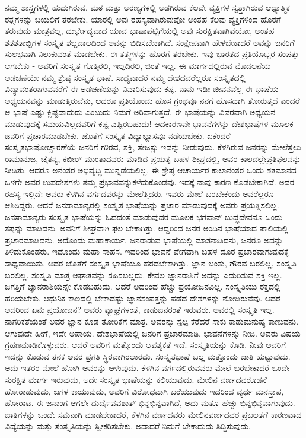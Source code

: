 ನಮ್ಮ ಶಾಸ್ತ್ರಗಳಲ್ಲಿ ಹುದುಗಿರುವ, ಮಠ ಮತ್ತು ಅರಣ್ಯಗಳಲ್ಲಿ ಅಡಗಿರುವ ಕೆಲವೇ ವ್ಯಕ್ತಿಗಳ ಸ್ವತ್ತಾಗಿರುವ ಆಧ್ಯಾತ್ಮಿಕ ರತ್ನಗಳನ್ನು ಬಯಲಿಗೆ ತರಬೇಕು. ಯಾರಲ್ಲಿ ಅವು ರಹಸ್ಯವಾಗಿರುವುವೋ ಅಂತಹ ಕೆಲವು ವ್ಯಕ್ತಿಗಳಿಂದ ಹೊರಗೆ ತರುವುದು ಮಾತ್ರವಲ್ಲ, ದುರ್ಭೇದ್ಯವಾದ ಯಾವ ಭಾಷಾಪೆಟ್ಟಿಗೆಯಲ್ಲಿ ಅವು ಸುರಕ್ಷಿತವಾಗಿವೆಯೋ, ಅಂತಹ ಶತಶತಾಬ್ದಿಗಳ ಸಂಸ್ಕೃತ ಶಬ್ದಜಾಲದಿಂದ ಅವನ್ನು ಬಿಡಿಸಬೇಕಾಗಿದೆ. ಸಂಕ್ಷೇಪವಾಗಿ ಹೇಳಬೇಕಾದರೆ ಅವನ್ನು ಜನರಿಗೆ ಸುಲಭವಾಗಿ ನಿಲುಕುವಂತೆ ಮಾಡಬೇಕು. ಈ ತತ್ತ್ವಗಳನ್ನು ಹೊರಗೆ ತರಬೇಕು. ಇವು ಭಾರತದ ಪ್ರತಿಯೊಬ್ಬರ ಸಂಪತ್ತು ಆಗಬೇಕು - ಅವರಿಗೆ ಸಂಸ್ಕೃತ ಗೊತ್ತಿರಲಿ, ಇಲ್ಲದಿರಲಿ, ಚಿಂತೆ ಇಲ್ಲ. ಈ ಮಾರ್ಗದಲ್ಲಿರುವ ಮೊದಲನೆಯ ಅಡಚಣೆಯೇ ನಮ್ಮ ಶ್ರೇಷ್ಠ ಸಂಸ್ಕೃತ ಭಾಷೆ. ಸಾಧ್ಯವಾದರೆ ನಮ್ಮ ದೇಶದವರೆಲ್ಲರೂ ಸಂಸ್ಕೃತದಲ್ಲಿ ವಿದ್ಯಾವಂತರಾಗುವವರೆಗೆ ಈ ಅಡಚಣೆಯನ್ನು ನಿವಾರಿಸುವುದು ಕಷ್ಟ. ನಾನು ಇಡೀ ಜೀವನವೆಲ್ಲ ಈ ಭಾಷೆಯ ಅಧ್ಯಯನವನ್ನು ಮಾಡುತ್ತಿರುವೆನು, ಆದರೂ ಪ್ರತಿಯೊಂದು ಹೊಸ ಗ್ರಂಥವೂ ನನಗೆ ಹೊಸದಾಗಿ ತೋರುತ್ತದೆ ಎಂದರೆ ಆ ಭಾಷೆ ಎಷ್ಟು ಕ್ಲಿಷ್ಟವಾದುದು ಎಂಬುದು ನಿಮಗೆ ಅರಿವಾಗುತ್ತದೆ. ಈ ಭಾಷೆಯನ್ನು ವಿವರವಾಗಿ ಅಧ್ಯಯನ ಮಾಡುವುದಕ್ಕೆ ಸಮಯವಿಲ್ಲದವರಿಗೆ ಕಷ್ಟ ಎಷ್ಟಿರಬಹುದು! ಆದಕಾರಣವೇ ಭಾವನೆಗಳನ್ನು ದೇಶಭಾಷೆಗಳ ಮೂಲಕ ಜನರಿಗೆ ಪ್ರಚಾರಮಾಡಬೇಕು. ಜೊತೆಗೆ ಸಂಸ್ಕೃತ ವಿದ್ಯಾಭ್ಯಾಸವೂ ನಡೆಯಬೇಕು. ಏಕೆಂದರೆ ಸಂಸ್ಕೃತಭಾಷೋಚ್ಚಾರಣೆಯೆ ಜನರಿಗೆ ಗೌರವ, ಶಕ್ತಿ, ತೇಜಸ್ಸು ಇವನ್ನು ನೀಡುವುದು. ಕೆಳಗಿರುವ ಜನರನ್ನು ಮೇಲೆತ್ತಲು ರಾಮಾನುಜ, ಚೈತನ್ಯ, ಕಬೀರ್​ ಮುಂತಾದವರು ಮಾಡಿದ ಪ್ರಯತ್ನ ಬಹಳ ಶೀಘ್ರದಲ್ಲಿ, ಅವರ ಕಾಲದಲ್ಲೇ\break ಪ್ರತಿಫಲವನ್ನು ನೀಡಿತು. ಆದರೂ ಅನಂತರ ಅಭಿವೃದ್ಧಿ ಮುನ್ನಡೆಯಲಿಲ್ಲ. ಈ ಶ್ರೇಷ್ಠ ಆಚಾರ್ಯರ ಕಾಲಾನಂತರ ಒಂದು ಶತಮಾನದ ಒಳಗೇ ಅವರ ಉಪದೇಶಗಳು ತಮ್ಮ ಪ್ರಭಾವವನ್ನುಕಳೆದುಕೊಂಡವು. ಇದಕ್ಕೆ ನಾವು ಕಾರಣ ಕೊಡಬೇಕಾಗಿದೆ. ಅದರ ರಹಸ್ಯ ಇಲ್ಲಿದೆ: ಅವರು ಕೆಳಗಿನ ವರ್ಗದವರನ್ನು ಮೇಲೆತ್ತಿದರು. ಇವರು ಮೇಲೆ ಬರಬೇಕೆಂದು ಅವರೆಲ್ಲರೂ ಆಶಿಸಿದ್ದರು. ಆದರೆ ಜನಸಾಮಾನ್ಯರಲ್ಲಿ ಸಂಸ್ಕೃತ ಭಾಷೆಯನ್ನು ಪ್ರಚಾರ ಮಾಡುವುದಕ್ಕೆ ಅವರು ಪ್ರಯತ್ನಿಸಲಿಲ್ಲ. ಜನಸಾಮಾನ್ಯರು ಸಂಸ್ಕೃತ ಭಾಷೆಯನ್ನು ಓದದಂತೆ ಮಾಡುವುದರ ಮೂಲಕ ಭಗವಾನ್​ ಬುದ್ಧದೇವನೂ ಒಂದು ತಪ್ಪನ್ನು ಮಾಡಿದನು. ಅವನಿಗೆ ಶೀಘ್ರವಾಗಿ ಫಲ ಬೇಕಾಗಿತ್ತು. ಆದ್ದರಿಂದ ಜನರ ಅಂದಿನ ಭಾಷೆಯಾದ ಪಾಲಿಯಲ್ಲಿ ಪ್ರಚಾರಮಾಡಿದನು. ಅದೊಂದು ಮಹಾಕಾರ್ಯ. ಜನರಾಡುವ ಭಾಷೆಯಲ್ಲಿ ಮಾತನಾಡಿದನು, ಜನರೂ ಅದನ್ನು ತಿಳಿದುಕೊಂಡರು. ಇದೊಂದು ಮಹಾ ಸಾಹಸ. ಇದರಿಂದ ಭಾವನೆ ವೇಗವಾಗಿ ಬಹಳ ದೂರ ಪ್ರಚಾರವಾಗುವುದಕ್ಕೆ ಸಾಧ್ಯವಾಯಿತು. ಅದರ ಜೊತೆಗೆ ಸಂಸ್ಕೃತ ಭಾಷೆಯೂ ಹರಡಬೇಕಾಗಿತ್ತು. ಜ್ಞಾನ ಬಂತು, ಗೌರವ ಬರಲಿಲ್ಲ, ಸಂಸ್ಕೃತಿ ಬರಲಿಲ್ಲ. ಸಂಸ್ಕೃತಿ ಮಾತ್ರ ಆಘಾತವನ್ನು ಸಹಿಸಬಲ್ಲದು. ಕೇವಲ ಜ್ಞಾನರಾಶಿಗೆ ಅದನ್ನು ಎದುರಿಸುವ ಶಕ್ತಿ ಇಲ್ಲ. ಜಗತ್ತಿಗೆ ಜ್ಞಾನರಾಶಿಯನ್ನೇ ಕೊಡಬಹುದು. ಆದರೆ ಅದರಿಂದ ಹೆಚ್ಚು ಪ್ರಯೋಜನವಿಲ್ಲ. ಸಂಸ್ಕೃತಿಯು ರಕ್ತದಲ್ಲಿ ಹರಿಯಬೇಕು. ಆಧುನಿಕ ಕಾಲದಲ್ಲಿ ಬೇಕಾದಷ್ಟು ಜ್ಞಾನಸಂಪತ್ತನ್ನು ಪಡೆದ ದೇಶಗಳನ್ನು ನೋಡಿರುವೆವು. ಆದರೆ ಅದರಿಂದ ಏನು ಪ್ರಯೋಜನ? ಅವರು ವ್ಯಾಘ್ರಗಳಂತೆ, ಕಾಡುಜನರಂತೆ ಇರುವರು. ಅವರಲ್ಲಿ ಸಂಸ್ಕೃತಿ ಇಲ್ಲ. ನಾಗರಿಕತೆಯಂತೆ ಅವರ ಜ್ಞಾನ ಕೂಡ ತೋರಿಕೆಗೆ ಮಾತ್ರ. ಅವರನ್ನು ಸ್ಪಲ್ಪ ಕೆರೆದರೆ ಸಾಕು ಕಾಡುಮನುಷ್ಯ ಕಾಣುವನು. ಆಗುವುದೇ ಹೀಗೆ, ಇದೇ ಅಪಾಯ. ದೇಶಭಾಷೆಯಲ್ಲಿ ಜನರಿಗೆ ಪ್ರಚಾರಮಾಡಿ, ಭಾವನೆಗಳನ್ನು ನೀಡಿ. ಅವರು ವಿಷಯ ಗ್ರಹಣಮಾಡಿಕೊಳ್ಳುವರು. ಆದರೆ ಅವರಿಗೆ ಮತ್ತೊಂದು ಆವಶ್ಯಕತೆ ಇದೆ. ಸಂಸ್ಕೃತಿಯನ್ನು ಕೊಡಿ. ನೀವು ಅವರಿಗೆ ಇದನ್ನು ಕೊಡುವ ತನಕ ಅವರ ಪ್ರಗತಿ ಸ್ಥಿರವಾಗಿರಲಾರದು. ಸಂಸ್ಕೃತಭಾಷೆ ಬಲ್ಲ ಮತ್ತೊಂದು ಜಾತಿ ಹುಟ್ಟುವುದು. ಅದು ಇತರರ ಮೇಲೆ ಹೋಗಿ ಅವರನ್ನು ಆಳುವುದು. ಕೆಳಗಿನ ವರ್ಗದಲ್ಲಿರುವವರು ಮೇಲೆ ಬರಬೇಕಾದರೆ ಒಂದೇ ಸುರಕ್ಷಿತ ಮಾರ್ಗ ಇರುವುದು, ಅದೇ ಸಂಸ್ಕೃತ ಭಾಷೆಯನ್ನು ಕಲಿಯುವುದು. ಮೇಲಿನ ವರ್ಣದವರೊಡನೆ ಹೋರಾಡುವುದು, ಜಗಳ ಕಾಯುವುದು, ಅವರಿಗೆ ವಿರೋಧವಾಗಿ ಬರೆಯುವುದು ಇದರಿಂದ ವ್ಯರ್ಥ ಮನಸ್ತಾಪ, ಹೋರಾಟ. ಈ ಜನಾಂಗ ಆಗಲೇ ದುರ್ದೈವವಶಾತ್​ ಭಿನ್ನಭಿನ್ನವಾಗಿದೆ, ಅದು ಮತ್ತೂ ಹೆಚ್ಚು ಭಿನ್ನಭಿನ್ನವಾಗುವುದು. ಜಾತಿಗಳನ್ನು ಒಂದೇ ಸಮನಾಗಿ ಮಾಡಬೇಕಾದರೆ, ಕೆಳಗಿನ ವರ್ಣದವರು ಮೇಲಿನವರ್ಣದವರ ಪ್ರಬಲತೆಗೆ ಕಾರಣವಾದ ವಿದ್ಯೆಯನ್ನು ಮತ್ತು ಸಂಸ್ಕೃತಿಯನ್ನು ಸ್ವೀಕರಿಸಬೇಕು. ಅದಾದರೆ ನಿಮಗೆ ಬೇಕಾದುದು ಸಿದ್ಧಿಸುವುದು.

